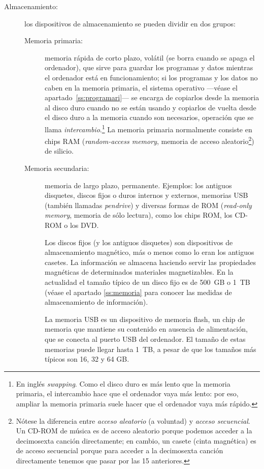 \begin{description}
\item[Almacenamiento:] los dispositivos de almacenamiento se pueden dividir en dos grupos: \begin{description} \item[Memoria primaria:] memoria rápida de corto plazo, volátil (se borra cuando se apaga el ordenador), que sirve para guardar los programas y datos mientras el ordenador está en funcionamiento; si los programas y los datos no caben en la memoria primaria, el sistema operativo ---véase el apartado~\ref{ss:programari}--- se encarga de copiarlos desde la memoria al disco duro cuando no se están usando y copiarlos de vuelta desde el disco duro a la memoria cuando son necesarios, operación que se llama \emph{intercambio}.\footnote{En inglés \emph{swapping}. Como el disco duro es más lento que la memoria primaria, el intercambio hace que el ordenador vaya más lento: por eso, ampliar la memoria primaria suele hacer que el ordenador vaya más rápido.} La memoria primaria normalmente consiste en chips RAM (\emph{random-access memory}, memoria de acceso aleatorio\footnote{Nótese la diferencia entre \emph{acceso aleatorio} (a voluntad) y \emph{acceso secuencial}. Un CD-ROM de música es de acceso aleatorio porque podemos acceder a la decimosexta canción directamente; en cambio, un casete (cinta magnética) es de acceso secuencial porque para acceder a la decimosexta canción directamente tenemos que pasar por las 15 anteriores.}) de silicio. 

\item[Memoria secundaria:] memoria de largo plazo, permanente. Ejemplos: los antiguos disquetes, discos fijos o duros internos y externos, memorias USB (también llamadas \emph{pendrive}) y diversas formas de ROM (\emph{read-only memory}, memoria de sólo lectura), como los chips ROM, los CD-ROM o los DVD. 

Los discos fijos (y los antiguos disquetes) son dispositivos de almacenamiento magnético, más o menos como lo eran los antiguos casetes. La información se almacena haciendo servir las propiedades magnéticas de determinados materiales magnetizables. En la actualidad el tamaño típico de un disco fijo es de 500~GB o 1~TB (véase el apartado \ref{ss:memoria} para conocer las medidas de almacenamiento de información). 

La memoria USB es un dispositivo de memoria flash, un chip de memoria que mantiene su contenido en ausencia de alimentación, que se conecta al puerto USB del ordenador. El tamaño de estas memorias puede llegar hasta 1~TB, a pesar de que los tamaños más típicos son 16, 32 y 64 GB. 


\end{description}
\end{description}
